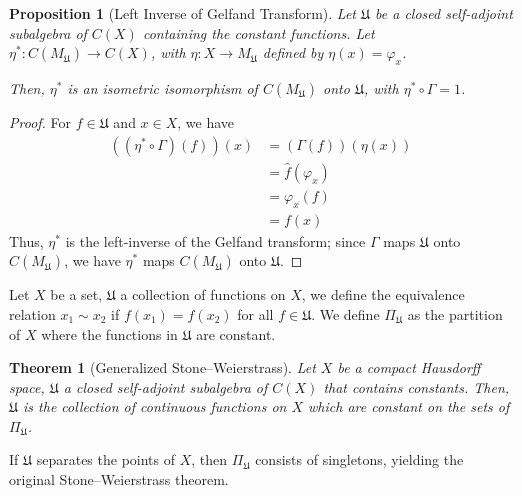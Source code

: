 \documentclass[10pt]{extarticle}
\theoremstyle{plain}
\newtheorem*{theorem}{Theorem}
\newtheorem*{proposition}{Proposition}
\theoremstyle{definition}
\theoremstyle{note}
\renewcommand{\newline}{\hfill\break}
\begin{document}
\begin{proposition}[Left Inverse of Gelfand Transform]
 Let $\mathfrak{U}$ be a closed self-adjoint subalgebra of $C(X)$ containing the constant functions. Let $\eta^{\ast}: C\left(M_{\mathfrak{U}}\right) \rightarrow C(X)$, with $\eta: X\rightarrow M_{\mathfrak{U}}$ defined by $\eta(x) = \varphi_{x}$.\newline

 Then, $\eta^{\ast}$ is an isometric isomorphism of $C\left(M_{\mathfrak{U}}\right)$ onto $\mathfrak{U}$, with $\eta^{\ast}\circ \Gamma = 1$.
\end{proposition}
\begin{proof}
  For $f\in \mathfrak{U}$ and $x\in X$, we have
  \begin{align*}
    \left(\left(\eta^{\ast}\circ \Gamma\right)\left(f\right)\right)\left(x\right) &= \left(\Gamma\left(f\right)\right)\left(\eta\left(x\right)\right)\\
                                                                                  &= \hat{f}\left(\varphi_{x}\right)\\
                                                                                  &= \varphi_{x}\left(f\right)\\
                                                                                  &= f(x)
  \end{align*}
  Thus, $\eta^{\ast}$ is the left-inverse of the Gelfand transform; since $\Gamma$ maps $\mathfrak{U}$ onto $C\left(M_{\mathfrak{U}}\right)$, we have $\eta^{\ast}$ maps $C\left(M_{\mathfrak{U}}\right)$ onto $\mathfrak{U}$.
\end{proof}
Let $X$ be a set, $\mathfrak{U}$ a collection of functions on $X$, we define the equivalence relation $x_1\sim x_2$ if $f\left(x_1\right) = f\left(x_2\right)$ for all $f\in \mathfrak{U}$. We define $\Pi_{\mathfrak{U}}$ as the partition of $X$ where the functions in $\mathfrak{U}$ are constant.
\begin{theorem}[Generalized Stone--Weierstrass]
  Let $X$ be a compact Hausdorff space, $\mathfrak{U}$ a closed self-adjoint subalgebra of $C(X)$ that contains constants. Then, $\mathfrak{U}$ is the collection of continuous functions on $X$ which are constant on the sets of $\Pi_{\mathfrak{U}}$.
\end{theorem}
If $\mathfrak{U}$ separates the points of $X$, then $\Pi_{\mathfrak{U}}$ consists of singletons, yielding the original Stone--Weierstrass theorem.
\end{document}
